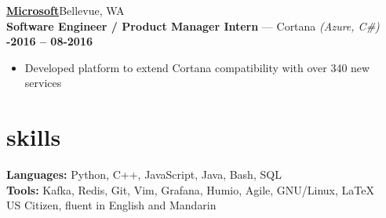 \documentclass[margin,10pt]{res/res}
\begin{document}
\begin{resume}
    \href{https://careers.microsoft.com/professionals/us/en/c-engineering}{\textbf{\large {}  Microsoft}}\hfill Bellevue, WA\\
    \textbf{Software Engineer / Product Manager Intern} --- Cortana
    \textit{(Azure, C\#)}\hfill
    \textsc{\bfseries{}-2016 -- 08-2016}
    \vspace{0.5em}
    \begin{itemize}
        \item Developed platform to extend Cortana compatibility with over 340 new services
    \end{itemize}

\vspace{5pt}

\section{\sc \lsstyle skills}
    \textbf{Languages:}
    Python, C++, JavaScript, Java, Bash, SQL\\
    \textbf{Tools:} Kafka, Redis, Git, Vim, Grafana, Humio, Agile, GNU/Linux, \LaTeX\\
    US Citizen, fluent in English and Mandarin
\end{resume}

\vspace{5pt}
\end{document}

